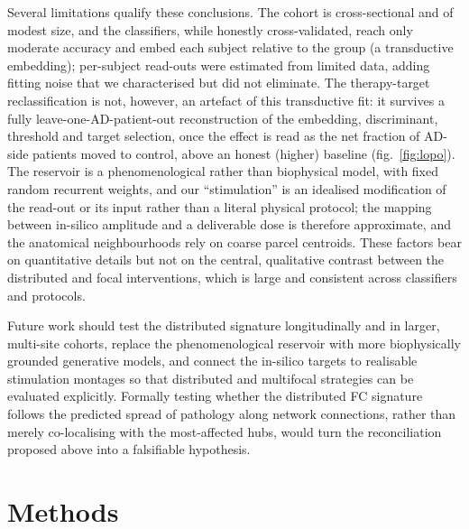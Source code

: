 \documentclass[11pt]{article}
\begin{document}
Several limitations qualify these conclusions. The cohort is cross-sectional and
of modest size, and the classifiers, while honestly cross-validated, reach only
moderate accuracy and embed each subject relative to the group (a transductive
embedding); per-subject read-outs were estimated from limited data, adding
fitting noise that we characterised but did not eliminate. The therapy-target
reclassification is not, however, an artefact of this transductive fit: it
survives a fully leave-one-AD-patient-out reconstruction of the embedding,
discriminant, threshold and target selection, once the effect is read as the net
fraction of AD-side patients moved to control, above an honest (higher) baseline
(fig.~\ref{fig:lopo}). The reservoir is a
phenomenological rather than biophysical model, with fixed random recurrent
weights, and our ``stimulation'' is an idealised modification of the read-out or
its input rather than a literal physical protocol; the mapping between in-silico
amplitude and a deliverable dose is therefore approximate, and the anatomical
neighbourhoods rely on coarse parcel centroids. These factors bear on
quantitative details but not on the central, qualitative contrast between the
distributed and focal interventions, which is large and consistent across
classifiers and protocols.

Future work should test the distributed signature longitudinally and in larger,
multi-site cohorts, replace the phenomenological reservoir with more
biophysically grounded generative models, and connect the in-silico targets to
realisable stimulation montages so that distributed and multifocal strategies
can be evaluated explicitly. Formally testing whether the distributed FC
signature follows the predicted spread of pathology along network connections,
rather than merely co-localising with the most-affected hubs, would turn the
reconciliation proposed above into a falsifiable hypothesis.

\section*{Methods}
\end{document}
